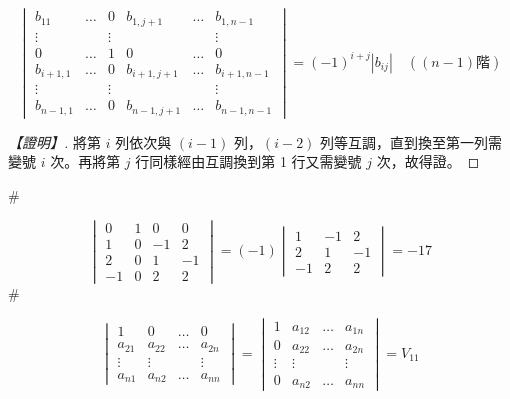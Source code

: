 \begin{corollary}\label{cor:b6s-1-3}
\begin{equation}
\begin{vmatrix}
b_{11} & \dots & 0 & b_{1,j+1} & \dots & b_{1,n-1} \\
\vdots & & \vdots & & & \vdots \\
0 & \dots & 1 & 0 & \dots & 0 \\
b_{i+1,1} & \dots & 0 & b_{i+1,j+1} & \dots & b_{i+1,n-1} \\
\vdots & & \vdots & & & \vdots \\
b_{n-1,1} & \dots & 0 & b_{n-1,j+1} & \dots & b_{n-1,n-1}
\end{vmatrix} = (-1)^{i+j} |b_{ij}| \quad ((n-1)\text{階}) \label{eq:b6s-1-6-12}
\end{equation}
\end{corollary}

\begin{proof}[【證明】]
將第 $i$ 列依次與 $(i-1)$ 列，$(i-2)$ 列等互調，直到換至第一列需變號 $i$ 次。再將第 $j$ 行同樣經由互調換到第 1 行又需變號 $j$ 次，故得證。
\end{proof}\hfill$\#$

\begin{example}\label{ex:b6s-1-27}
\[ \begin{vmatrix}
0 & 1 & 0 & 0 \\
1 & 0 & -1 & 2 \\
2 & 0 & 1 & -1 \\
-1 & 0 & 2 & 2
\end{vmatrix} = (-1) \begin{vmatrix}
1 & -1 & 2 \\
2 & 1 & -1 \\
-1 & 2 & 2
\end{vmatrix} = -17 \]\hfill$\#$
\end{example}

\begin{lemma}\label{lem:b6s-1-2}
\begin{equation}
\begin{vmatrix}
1 & 0 & \dots & 0 \\
a_{21} & a_{22} & \dots & a_{2n} \\
\vdots & \vdots & & \vdots \\
a_{n1} & a_{n2} & \dots & a_{nn}
\end{vmatrix} = \begin{vmatrix}
1 & a_{12} & \dots & a_{1n} \\
0 & a_{22} & \dots & a_{2n} \\
\vdots & \vdots & & \vdots \\
0 & a_{n2} & \dots & a_{nn}
\end{vmatrix} = V_{11} \label{eq:b6s-1-6-13}
\end{equation}
\end{lemma}

